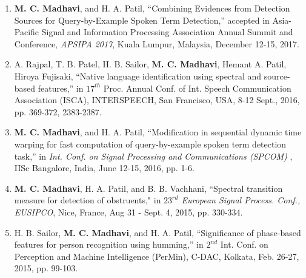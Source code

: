\documentclass[10pt]{article}
\begin{document}
\begin{enumerate}[resume]



\item 	\textbf{M. C. Madhavi}, and H. A. Patil, ``Combining Evidences from Detection Sources for Query-by-Example Spoken Term Detection,'' accepted in Asia-Pacific Signal and Information Processing Association Annual Summit and Conference, \textit{APSIPA 2017}, Kuala Lumpur, Malaysia, December 12-15, 2017. 

\item A. Rajpal, T. B. Patel, H. B. Sailor, \textbf{M. C. Madhavi}, Hemant A. Patil, Hiroya Fujisaki, ``Native language identification using spectral and source-based features,''  in $ 17^{th} $ Proc. Annual  Conf. of Int. Speech Communication Association (ISCA), INTERSPEECH, San Francisco, USA, 8-12 Sept., 2016, pp. 369-372,  2383-2387.

\item 	\textbf{M. C. Madhavi}, and H. A. Patil, ``Modification in sequential dynamic time warping for fast computation of query-by-example spoken term detection task,''  in \textit{Int. Conf. on Signal Processing and Communications (SPCOM)} , IISc Bangalore, India, June 12-15, 2016, pp. 1-6.

\item \textbf{M. C. Madhavi}, H. A. Patil, and B. B. Vachhani, ``Spectral transition measure for detection of obstruents," in \textit{$23^{rd}$ European
Signal Process. Conf., EUSIPCO}, Nice, France, Aug 31 - Sept. 4, 2015, pp. 330-334.

\item H. B. Sailor, \textbf{M. C. Madhavi}, and H. A. Patil, ``Significance of phase-based features for person recognition using humming,'' in $2^{nd}$ Int. Conf. on Perception and Machine Intelligence (PerMin), C-DAC, Kolkata, Feb. 26-27, 2015, pp. 99-103. 


\end{enumerate}
\end{document}
